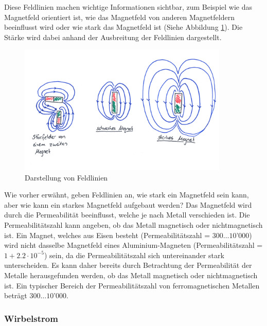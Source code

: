 Diese Feldlinien machen wichtige Informationen sichtbar, zum Beispiel wie das Magnetfeld orientiert ist, wie das Magnetfeld von anderen Magnetfeldern beeinflusst wird oder wie stark das Magnetfeld ist (Siehe Abbildung \ref{fig:magnetismus_feldlinien}). Die Stärke wird dabei anhand der Ausbreitung der Feldlinien dargestellt.

\begin{figure}[ht]
    \begin{center}
      \includegraphics[width=10cm]{assets/images/magnetismus/beeinflussungen_magnet}
    \end{center}
    \vspace{-3ex}
    \caption{Darstellung von Feldlinien}
\label{fig:magnetismus_feldlinien}
\end{figure}

Wie vorher erwähnt, geben Feldlinien an, wie stark ein Magnetfeld sein kann, aber wie kann ein starkes Magnetfeld aufgebaut werden? Das Magnetfeld wird durch die Permeabilität beeinflusst, welche je nach Metall verschieden ist. 
\newpara
Die Permeabilitätszahl kann angeben, ob das Metall magnetisch oder nichtmagnetisch ist. Ein Magnet, welches aus Eisen besteht (Permeabilitätszahl = $300…10’000$) wird nicht dasselbe Magnetfeld eines Aluminium-Magneten (Permeabilitätszahl = $1 + 2.2 \cdot 10^{-5}$) sein, da die Permeabilitätszahl sich untereinander stark unterscheiden. Es kann daher bereits durch Betrachtung der Permeabilität der Metalle herausgefunden werden, ob das Metall magnetisch oder nichtmagnetisch ist. Ein typischer Bereich der Permeabilitätszahl von ferromagnetischen Metallen beträgt $300…10’000$. 
\newpage

\subsubsection{Wirbelstrom}

